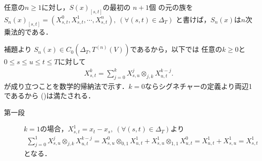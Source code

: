 	\begin{screen}
		\begin{thm}[逐次積分により定まる乗法的汎関数]
		\label{thm:signature_of_path_multiplicative}
			任意の$n \geq 1$に対し，$S(x)_{[s,t]}$の最初の
			$n+1$個\footnotemark
			の元の族を$S_n(x)_{[s,t]} = (X^0_{s,t},X^1_{s,t},\cdots,X^n_{s,t}),\ 
			(\forall (s,t) \in \Delta_T)$
			と書けば，$S_n(x)$は$n$次乗法的である．
		\end{thm}
	\end{screen}
	
	\begin{prf}
		補題より
		$S_n(x) \in C_0 \left(\Delta_T,T^{(n)}(V) \right)$であるから，以下では
		任意の$k \geq 0$と$0 \leq s \leq u \leq t \leq T$に対して
		\begin{align}
			X^k_{s,t} = \sum_{j=0}^k X^j_{s,u} \otimes_{j,k} X^{k-j}_{u,t}.
			\label{eq:thm_signature_of_path_multiplicative_1}
		\end{align}
		が成り立つことを数学的帰納法で示す．$k=0$ならシグネチャーの定義より両辺1であるから
		()は満たされる．
		\begin{description}
			\item[第一段]$k=1$の場合，$X^1_{s,t} = x_t - x_s,\ (\forall (s,t) \in \Delta_T)$より
				\begin{align}
					\sum_{j=0}^1 X^j_{s,u} \otimes_{j,k} X^{k-j}_{u,t}
					= X^0_{s,u} \otimes_{0,1} X^1_{u,t}
					+ X^1_{s,u} \otimes_{1,1} X^0_{u,t}
					= X^1_{u,t} + X^1_{s,u}
					= X^1_{s,t}
				\end{align}
				となる．
				

\end{description}
\end{prf}
